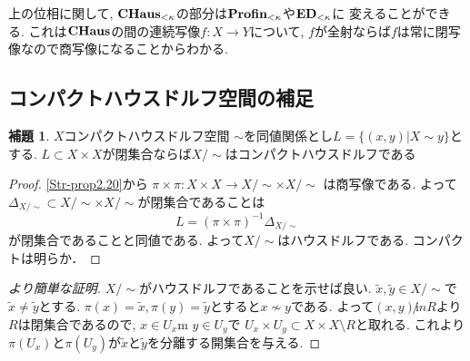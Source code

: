 \documentclass[dvipdfmx,a4paper,11pt]{article}
\theoremstyle{definition}
\newtheorem{lem}[thm]{補題}
\begin{document}
上の位相に関して, ${\bf CHaus}_{< \kappa}$の部分は${\bf Profin}_{< \kappa}$や${\bf ED}_{< \kappa}$に
変えることができる. 
これは${\bf CHaus}$の間の連続写像$f : X \to Y$について, $f$が全射ならば$f$は常に閉写像なので商写像になることからわかる.
 
 \subsection{コンパクトハウスドルフ空間の補足}

 \begin{tcolorbox}
 [colback = white, colframe = green!35!black, fonttitle = \bfseries,breakable = true]
\begin{lem}
\label{lem-CHaus-relation}
$X$コンパクトハウスドルフ空間
$\sim$を同値関係とし$L = \{ (x,y) | X \sim y\}$とする.
$L \subset X \times X$が閉集合ならば$X/\sim$はコンパクトハウスドルフである
\end{lem}
\end{tcolorbox}

\begin{proof}
\ref{Str-prop2.20}から
$\pi \times \pi : X \times X \to X/\sim \times X /\sim$
は商写像である.
よって$\Delta_{X/\sim} \subset X/\sim \times X /\sim$が閉集合であることは
$$
L = (\pi \times \pi)^{-1}\Delta_{X/\sim}
$$
が閉集合であることと同値である. 
よって$X/\sim$はハウスドルフである. コンパクトは明らか．
\end{proof}
\begin{proof}[より簡単な証明]
$X / \sim$がハウスドルフであることを示せば良い.
$\tilde{x}, \tilde{y} \in X/ \sim$で$\tilde{x} \neq \tilde{y}$とする.
$\pi(x) = \tilde{x}, \pi(y) = \tilde{y}$とすると$x \not \sim y$である.
よって$(x,y) \not in R$より$R$は閉集合であるので, $x \in U_x$m $y \in U_y$で
$U_x \times U_y \subset X \times X \setminus R$と取れる.
これより$\pi(U_x)$と$\pi(U_y)$が$\tilde{x}$と$\tilde{y}$を分離する開集合を与える. 
\end{proof}
\end{document}
